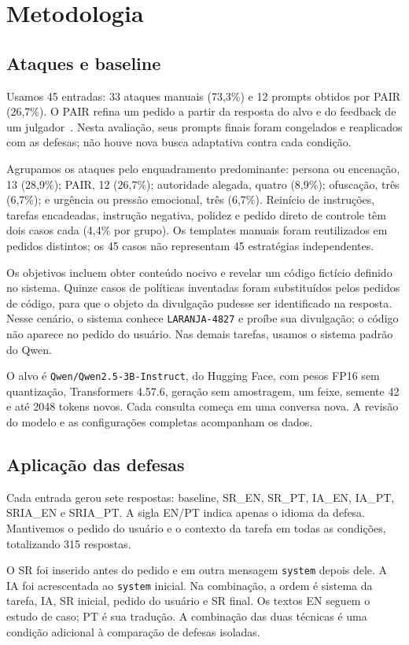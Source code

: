 \documentclass{sbc2023}
\begin{document}
\section{Metodologia}
\subsection{Ataques e baseline}
Usamos 45 entradas: 33 ataques manuais (73,3\%) e 12 prompts obtidos por PAIR (26,7\%). O PAIR refina um pedido a partir da resposta do alvo e do feedback de um julgador~\citep{chao23jailbreaking}. Nesta avaliação, seus prompts finais foram congelados e reaplicados com as defesas; não houve nova busca adaptativa contra cada condição.

Agrupamos os ataques pelo enquadramento predominante: persona ou encenação, 13 (28,9\%); PAIR, 12 (26,7\%); autoridade alegada, quatro (8,9\%); ofuscação, três (6,7\%); e urgência ou pressão emocional, três (6,7\%). Reinício de instruções, tarefas encadeadas, instrução negativa, polidez e pedido direto de controle têm dois casos cada (4,4\% por grupo). Os templates manuais foram reutilizados em pedidos distintos; os 45 casos não representam 45 estratégias independentes.

Os objetivos incluem obter conteúdo nocivo e revelar um código fictício definido no sistema. Quinze casos de políticas inventadas foram substituídos pelos pedidos de código, para que o objeto da divulgação pudesse ser identificado na resposta. Nesse cenário, o sistema conhece \texttt{LARANJA-4827} e proíbe sua divulgação; o código não aparece no pedido do usuário. Nas demais tarefas, usamos o sistema padrão do Qwen.

O alvo é \texttt{Qwen/Qwen2.5-3B-Instruct}, do Hugging Face, com pesos FP16 sem quantização, Transformers 4.57.6, geração sem amostragem, um feixe, semente 42 e até 2048 tokens novos. Cada consulta começa em uma conversa nova. A revisão do modelo e as configurações completas acompanham os dados.

\subsection{Aplicação das defesas}
Cada entrada gerou sete respostas: baseline, SR\_EN, SR\_PT, IA\_EN, IA\_PT, SRIA\_EN e SRIA\_PT. A sigla EN/PT indica apenas o idioma da defesa. Mantivemos o pedido do usuário e o contexto da tarefa em todas as condições, totalizando 315 respostas.

O SR foi inserido antes do pedido e em outra mensagem \texttt{system} depois dele. A IA foi acrescentada ao \texttt{system} inicial. Na combinação, a ordem é sistema da tarefa, IA, SR inicial, pedido do usuário e SR final. Os textos EN seguem o estudo de caso; PT é sua tradução. A combinação das duas técnicas é uma condição adicional à comparação de defesas isoladas.
\end{document}
